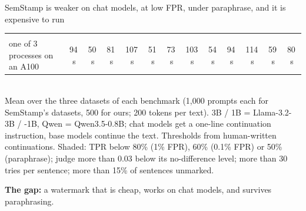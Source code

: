 \begin{frame}{SemStamp is weaker on chat models, at low FPR, under paraphrase, and it is expensive to run}
{\begin{tabular}{lcccccc|cccccc}
\makecell[l]{\textbf{Time per text}\\[-1pt]{\tiny one of 3 processes on an A100}} & 94\,s & 50\,s & 81\,s & 107\,s & 51\,s & 73\,s & 103\,s & 54\,s & 94\,s & 114\,s & 59\,s & 80\,s \\
\bottomrule
\end{tabular}}
\\[4pt]
{\tiny Mean over the three datasets of each benchmark (1,000 prompts each for SemStamp's datasets, 500 for ours; 200 tokens per text). 3B / 1B = Llama-3.2-3B / -1B, Qwen = Qwen3.5-0.8B; chat models get a one-line continuation instruction, base models continue the text. Thresholds from human-written continuations. Shaded: TPR below 80\% (1\% FPR), 60\% (0.1\% FPR) or 50\% (paraphrase); judge more than 0.03 below its no-difference level; more than 30 tries per sentence; more than 15\% of sentences unmarked.}
\\[3pt]\raggedright\small\textcolor{gapink}{\textbf{The gap:}} a watermark that is cheap, works on chat models, and survives paraphrasing.
\end{frame}

